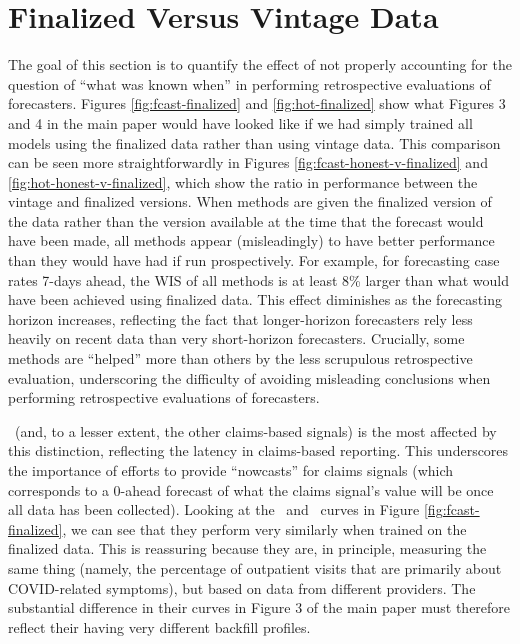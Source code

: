 \section{Finalized Versus Vintage Data}

The goal of this section is to quantify the effect of not properly accounting
for the question of ``what was known when'' in performing retrospective
evaluations of forecasters.  Figures \ref{fig:fcast-finalized} and
\ref{fig:hot-finalized} show what Figures 3 and 4 in the main paper would have
looked like if we had simply trained all models using the finalized data rather
than using vintage data.  This comparison can be seen more straightforwardly in
Figures \ref{fig:fcast-honest-v-finalized} and \ref{fig:hot-honest-v-finalized},
which show the ratio in performance between the vintage and finalized versions.
When methods are given the finalized version of the data rather than the version
available at the time that the forecast would have been made, all methods appear
(misleadingly) to have better performance than they would have had if run
prospectively.  For example, for forecasting case rates 7-days ahead, the WIS of
all methods is at least 8\% larger than what would have been achieved using
finalized data.  This effect diminishes as the forecasting horizon increases,
reflecting the fact that longer-horizon forecasters rely less heavily on recent
data than very short-horizon forecasters.  Crucially, some methods are
``helped'' more than others by the less scrupulous retrospective evaluation,
underscoring the difficulty of avoiding misleading conclusions when performing
retrospective evaluations of forecasters.

\chngcli~(and, to a lesser extent, the other claims-based signals) is the most
affected by this distinction, reflecting the latency in claims-based reporting.
This underscores the importance of efforts to provide ``nowcasts'' for claims
signals (which corresponds to a 0-ahead forecast of what the claims signal's
value will be once all data has been collected). Looking at the \chngcli~and
\dv~curves in Figure \ref{fig:fcast-finalized}, we can see that they perform
very similarly when trained on the finalized data.  This is reassuring because
they are, in principle, measuring the same thing (namely, the percentage of
outpatient visits that are primarily about COVID-related symptoms), but based on
data from different providers.  The substantial difference in their curves in
Figure 3 of the main paper must therefore reflect their having very different
backfill profiles. 
  
